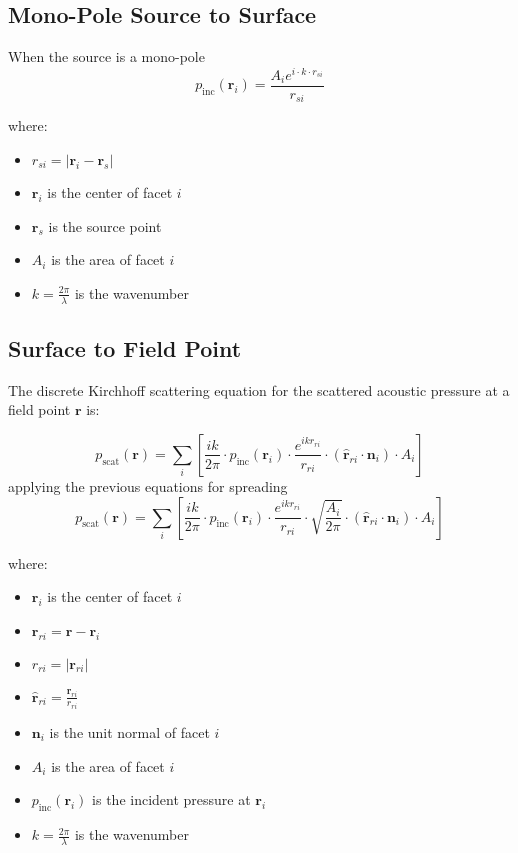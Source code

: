 \documentclass{article}
\begin{document}
\subsection{Mono-Pole Source to Surface}

When the source is a mono-pole 
\[
    p_{\text{inc}}(\mathbf{r}_i) = \frac{A_i e^{i \cdot k \cdot r_{si}}}{r_{si}}
\]

where:

\begin{itemize}
    \item \( r_{si} = |\mathbf{r}_i - \mathbf{r}_s| \)
    \item \( \mathbf{r}_i \) is the center of facet \( i \)
    \item \( \mathbf{r}_s \) is the source point
    \item \( A_i \) is the area of facet \( i \)
    \item \( k = \frac{2\pi}{\lambda} \) is the wavenumber
\end{itemize}

\subsection{Surface to Field Point}
The discrete Kirchhoff scattering equation for the scattered acoustic pressure at a field point \( \mathbf{r} \) is:

\[
p_{\text{scat}}(\mathbf{r}) = \sum_{i} 
\left[
    \frac{ik}{2\pi} \cdot 
    p_{\text{inc}}(\mathbf{r}_i) \cdot 
    \frac{e^{ik r_{ri}}}{r_{ri}} \cdot 
    (\hat{\mathbf{r}}_{ri} \cdot \mathbf{n}_i) \cdot 
    A_i
\right]
\]
applying the previous equations for spreading
\[
    p_{\text{scat}}(\mathbf{r}) = \sum_{i} 
    \left[
        \frac{ik}{2\pi} \cdot 
        p_{\text{inc}}(\mathbf{r}_i) \cdot 
        \frac{e^{ik r_{ri}}}{r_{ri}} \cdot
        \sqrt{\frac{A_i}{2 \pi}} \cdot
        (\hat{\mathbf{r}}_{ri} \cdot \mathbf{n}_i) \cdot 
        A_i
    \right]
\]



where:

\begin{itemize}
    \item \( \mathbf{r}_i \) is the center of facet \( i \)
    \item \( \mathbf{r}_{ri} = \mathbf{r} - \mathbf{r}_i \)
    \item \( r_{ri} = |\mathbf{r}_{ri}| \)
    \item \( \hat{\mathbf{r}}_{ri} = \frac{\mathbf{r}_{ri}}{r_{ri}} \)
    \item \( \mathbf{n}_i \) is the unit normal of facet \( i \)
    \item \( A_i \) is the area of facet \( i \)
    \item \( p_{\text{inc}}(\mathbf{r}_i) \) is the incident pressure at \( \mathbf{r}_i \)
    \item \( k = \frac{2\pi}{\lambda} \) is the wavenumber
\end{itemize}
\end{document}

